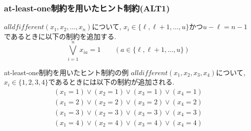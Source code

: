 \begin{frame}
    \frametitle{at-least-one制約を用いたヒント制約(ALT1)}
    \vspace{-3mm}
    \begin{block}{}
        $alldfifferent(x_1,x_2,\ldots,x_n)$について, $x_i \in \{\ell, \ell+1,\ldots, u\}$かつ$u-\ell=n-1$であるときに以下の制約を追加する.\\
        \vspace{-3mm}
        $$\bigvee_{i=1}^n x_{ia}=1 \qquad (a \in \{\ell, \ell+1, \ldots, u\})$$
    \end{block}
    \begin{exampleblock}{at-least-one制約を用いたヒント制約の例}
        $alldifferent(x_1, x_2, x_3, x_4)$について, $x_i \in \{1, 2, 3, 4\}$であるときには以下の制約が追加される.
        \vspace{-3mm}
        \begin{eqnarray*}
            (x_1=1) \lor (x_2=1) \lor (x_3=1) \lor (x_4=1)\\
            (x_1=2) \lor (x_2=2) \lor (x_3=2) \lor (x_4=2)\\
            (x_1=3) \lor (x_2=3) \lor (x_3=3) \lor (x_4=3)\\
            (x_1=4) \lor (x_2=4) \lor (x_3=4) \lor (x_4=4)
        \end{eqnarray*}
    \end{exampleblock}
\end{frame}


